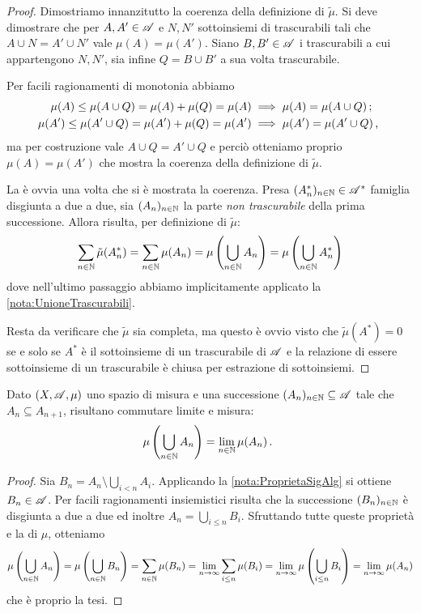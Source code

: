 \begin{proof}
	Dimostriamo innanzitutto la coerenza della definizione di $\tilde\mu$. Si deve dimostrare che per $A,A'\in\mathscr A$ e $N,N'$ sottoinsiemi di trascurabili tali che $A\cup N=A'\cup N'$ vale $\mu(A)=\mu(A')$. Siano $B,B'\in\mathscr A$ i trascurabili a cui appartengono $N,N'$, sia infine $Q=B\cup B'$ a sua volta trascurabile.
	
	Per facili ragionamenti di monotonia abbiamo
	\begin{align*}
		\mu(A)\le \mu(A\cup Q) =\mu(A)+\mu(Q)=\mu(A) &\implies \mu(A)=\mu(A\cup Q) \, \text{; }\\
		\mu(A')\le \mu(A'\cup Q) =\mu(A')+\mu(Q)=\mu(A') &\implies \mu(A')=\mu(A'\cup Q) \, \text{, }
	\end{align*}
	ma per costruzione vale $A\cup Q=A'\cup Q$ e perciò otteniamo proprio $\mu(A)=\mu(A')$ che mostra la coerenza della definizione di $\tilde\mu$.
	
	La \sigadd[ità] è ovvia una volta che si è mostrata la coerenza. Presa $(A^*_n)_{n\in\mathbb N}\in\mathscr A^*$ famiglia disgiunta a due a due, sia $(A_n)_{n\in\mathbb N}$ la parte \emph{non trascurabile} della prima successione. Allora risulta, per definizione di $\tilde\mu$:
	\begin{equation*}
		\sum_{n\in\mathbb N} \tilde\mu(A^*_n)=\sum_{n\in\mathbb N} \mu(A_n)=\mu\left(\bigcup_{n\in\mathbb N} A_n\right)=\mu\left(\bigcup_{n\in\mathbb N} A^*_n\right)
	\end{equation*}
	dove nell'ultimo passaggio abbiamo implicitamente applicato la \cref{nota:UnioneTrascurabili}.
	
	Resta da verificare che $\tilde\mu$ sia completa, ma questo è ovvio visto che  $\tilde\mu(A^*)=0$ se e solo se $A^*$ è il sottoinsieme di un trascurabile di $\mathscr A$ e la relazione di essere sottoinsieme di un trascurabile è chiusa per estrazione di sottoinsiemi. 
\end{proof}



\begin{proposition}\label{prop:LimiteMonotonoCrescenteMisura}
	Dato $(X,\mathscr A,\mu)$ uno spazio di misura e una successione $(A_n)_{n\in\mathbb N}\subseteq \mathscr A$ tale che $A_n\subseteq A_{n+1}$, risultano commutare limite e misura:
	\begin{equation*}
		\mu\left(\bigcup_{n\in\mathbb N} A_n\right)=\lim_{n\in\mathbb N} \mu(A_n) \, \text{. }
	\end{equation*}
\end{proposition}
\begin{proof}
	Sia $B_n=A_n\setminus\bigcup_{i<n}A_i$. Applicando la \cref{nota:ProprietaSigAlg} si ottiene $B_n\in\mathscr A$.
	Per facili ragionamenti insiemistici risulta che la successione $(B_n)_{n\in\mathbb N}$ è disgiunta a due a due ed inoltre $A_n=\bigcup_{i\le n}B_i$.
	Sfruttando tutte queste proprietà e la \sigadd[ità] di $\mu$, otteniamo
	\begin{equation*}
		\mu\left(\bigcup_{n\in\mathbb N} A_n\right)=\mu\left(\bigcup_{n\in\mathbb N} B_n\right)=
		\sum_{n\in\mathbb N} \mu(B_n)=\lim_{n\to\infty} \sum_{i\le n} \mu(B_i)=
		\lim_{n\to\infty} \mu\left(\bigcup_{i\le n} B_i\right)=\lim_{n\to\infty} \mu(A_n)
	\end{equation*}
	che è proprio la tesi.
\end{proof}

